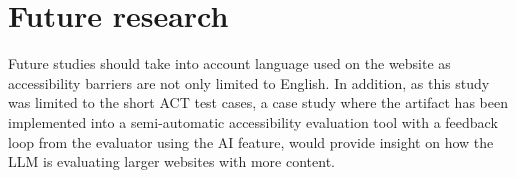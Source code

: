\section{Future research}

Future studies should take into account language used on the website as accessibility barriers are not only limited to English. In addition, as this study was limited to the short ACT test cases, a case study where the artifact has been implemented into a semi-automatic accessibility evaluation tool with a feedback loop from the evaluator using the AI feature, would provide insight on how the LLM is evaluating larger websites with more content. 

